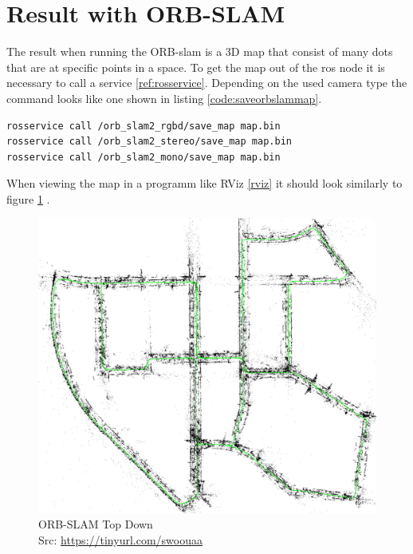 \section{Result with ORB-SLAM}
The result when running the ORB-\gls{slam} is a 3D map that consist of many dots that are at specific points in a space. To get the map out of the \gls{ros} node it is necessary to call a service \ref{ref:rosservice}. Depending on the used camera type the command looks like one shown in listing \ref{code:saveorbslammap}.\newline
\begin{lstlisting}[language=BASH,caption={Saving map from ORB-SLAM},label={code:saveorbslammap}]
rosservice call /orb_slam2_rgbd/save_map map.bin
rosservice call /orb_slam2_stereo/save_map map.bin
rosservice call /orb_slam2_mono/save_map map.bin
\end{lstlisting}
When viewing the map in a programm like RViz \ref{rviz} it should look similarly to figure \ref{img:orbslammaptopdown} \newline.
\begin{figure}[h]
	\centering
	\includegraphics[height=0.5\textwidth]{./media/images/orbslamtopdown.png}
  	\caption{ORB-SLAM Top Down
  	\\ Src: \url{https://tinyurl.com/swoouaa}}
  	\label{img:orbslammaptopdown}
\end{figure}


